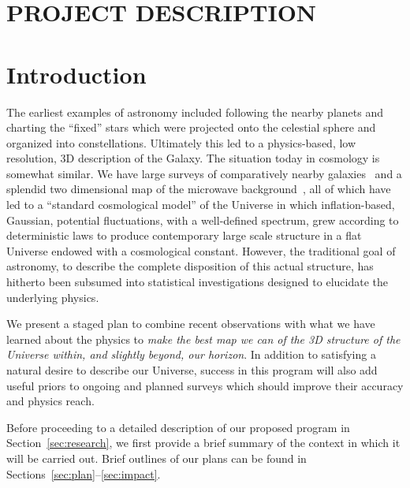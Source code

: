 \documentclass[psfig,12pt]{article}
\def\ni{\noindent}
\begin{document}
\section*{PROJECT DESCRIPTION}


\section{Introduction}
\label{sec:intro}

\ni{\bf Mapping Our Universe:}
The earliest examples of astronomy included following the nearby planets
and charting the ``fixed'' stars which were projected onto the celestial
sphere and organized into constellations. Ultimately this led to a
physics-based, low resolution,  3D description of the Galaxy. The
situation today in cosmology is somewhat similar. We have large surveys
of comparatively nearby galaxies~\cite{Kaiser2002, Ivezc2002, Davis2003,
Giavalisco2004, DES2005, Faber2007, Scoville2007,
Kaiser2010, Blake2011, Alam2015} and a splendid
two dimensional map of the microwave background~\cite{Planck2015maps, WMAP2013maps},
all of which have led to a ``standard cosmological model'' of the
Universe in which
inflation-based, Gaussian, potential fluctuations, with a well-defined
spectrum, grew according to deterministic laws to produce contemporary
large scale structure in a flat Universe endowed with a cosmological
constant. However, the traditional goal of astronomy, to describe the
complete disposition of this actual structure, has hitherto been
subsumed into statistical investigations designed to elucidate the
underlying physics.

We present a staged plan to combine recent observations with what we
have learned about the physics to {\it make the best map we can of the 3D
structure of the Universe within, and slightly beyond, our horizon}. In
addition to satisfying a natural desire to describe our Universe,
success in this program will also add useful priors to ongoing and planned
surveys which should improve their accuracy and physics reach.

Before proceeding to a detailed description of our proposed program in
Section~\ref{sec:research}, we first provide a brief summary of the
context in which it will be carried out. Brief outlines of our plans
can be found in
Sections~\ref{sec:plan}--\ref{sec:impact}.
\end{document}
